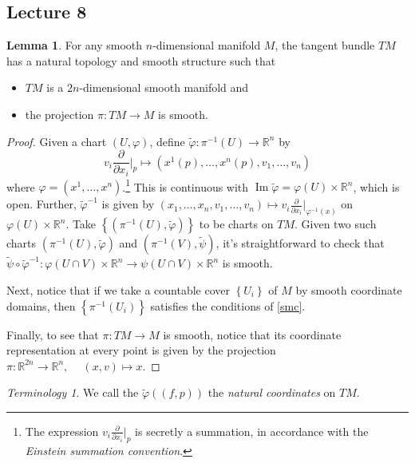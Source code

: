 \documentclass[10pt,letterpaper,cm]{nupset}
\theoremstyle{definition}
\theoremstyle{theorem}
\newtheorem{lemma}[definition]{Lemma}
\theoremstyle{remark}
\newtheorem*{term}{Terminology}
\DeclareMathOperator{\Ima}{Im}
\newcommand{\R}{\mathbb R}
\newcommand{\1}{\mathbf{1}}
\newcommand{\0}{\vec 0}
\begin{document}
\subsection{Lecture 8}

\begin{lemma}
For any smooth $n$-dimensional manifold $M$, the tangent bundle $TM$ has a natural topology and smooth structure such that 
\begin{itemize}
\item $TM$ is a $2n$-dimensional smooth manifold and 
\item the projection $\pi : TM \to M$ is smooth.
\end{itemize}
\end{lemma}
\begin{proof}
Given a chart $\left(U, \varphi\right)$, define $\tilde{\varphi}: \pi^{-1}(U) \to \R^n$ by $$v_i\frac{\partial}{\partial{x_i}}\bigr\rvert_p \mapsto \left(x^1(p), \ldots, x^n(p), v_1, \ldots, v_n\right)$$ where $\varphi = \left(x^1, \ldots, x^n\right)$.\footnote{The expression $v_i\frac{\partial}{\partial{x_i}}\bigr\rvert_p$ is secretly a summation, in accordance with the \textit{Einstein summation convention}.}
This is continuous with $\Ima \tilde{\varphi} = \varphi(U) \times \R^n$, which is open. Further, $\tilde{\varphi}^{-1}$ is given by $\left(x_1, \ldots, x_n, v_1, \ldots, v_n\right)\mapsto v_i \frac{\partial}{\partial{x_i}}\bigr\rvert_{\varphi^{-1}(x)}$ on  $\varphi(U) \times \R^n$. Take $\left\{\left(\pi^{-1}(U), \tilde{\varphi}\right)\right\}$ to be charts on $TM$. Given two such charts $\left(\pi^{-1}(U), \tilde{\varphi}\right)$ and $\left(\pi^{-1}(V), \tilde{\psi}\right)$, it's straightforward to check that $\tilde{\psi} \circ \tilde{\varphi}^{-1}: \varphi(U \cap V)\times \R^n \to \psi(U \cap V)\times \R^n$ is smooth.

\medskip


Next, notice that if we take a countable cover $\left\{U_i\right\}$ of $M$ by smooth coordinate domains, then $\left\{\pi^{-1}(U_i)\right\}$ satisfies the conditions of \cref{smc}.

\medskip


Finally, to see that $\pi : TM \to M$ is smooth, notice that its coordinate representation at every point is given by the projection $\pi:\R^{2n} \to \R^n, \ \quad (x,v) \mapsto x$.
\end{proof}

\begin{term}
We call the $\tilde{\varphi}\left((f, p)\right)$ the \textit{natural coordinates} on $TM$.
\end{term}
\end{document}
